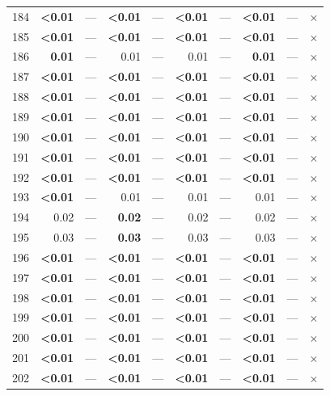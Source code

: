 \begin{longtable}{lr@{\hskip 4pt}l@{\hskip 12pt}r@{\hskip 4pt}l@{\hskip 12pt}r@{\hskip 4pt}l@{\hskip 12pt}r@{\hskip 4pt}l@{\hskip 12pt}r}
184 & \textbf{<0.01} & --- & \textbf{<0.01} & --- & \textbf{<0.01} & --- & \textbf{<0.01} & --- & $\times$ \\
185 & \textbf{<0.01} & --- & \textbf{<0.01} & --- & \textbf{<0.01} & --- & \textbf{<0.01} & --- & $\times$ \\
186 & \textbf{0.01} & --- & 0.01 & --- & 0.01 & --- & \textbf{0.01} & --- & $\times$ \\
187 & \textbf{<0.01} & --- & \textbf{<0.01} & --- & \textbf{<0.01} & --- & \textbf{<0.01} & --- & $\times$ \\
188 & \textbf{<0.01} & --- & \textbf{<0.01} & --- & \textbf{<0.01} & --- & \textbf{<0.01} & --- & $\times$ \\
189 & \textbf{<0.01} & --- & \textbf{<0.01} & --- & \textbf{<0.01} & --- & \textbf{<0.01} & --- & $\times$ \\
190 & \textbf{<0.01} & --- & \textbf{<0.01} & --- & \textbf{<0.01} & --- & \textbf{<0.01} & --- & $\times$ \\
191 & \textbf{<0.01} & --- & \textbf{<0.01} & --- & \textbf{<0.01} & --- & \textbf{<0.01} & --- & $\times$ \\
192 & \textbf{<0.01} & --- & \textbf{<0.01} & --- & \textbf{<0.01} & --- & \textbf{<0.01} & --- & $\times$ \\
193 & \textbf{<0.01} & --- & 0.01 & --- & 0.01 & --- & 0.01 & --- & $\times$ \\
194 & 0.02 & --- & \textbf{0.02} & --- & 0.02 & --- & 0.02 & --- & $\times$ \\
195 & 0.03 & --- & \textbf{0.03} & --- & 0.03 & --- & 0.03 & --- & $\times$ \\
196 & \textbf{<0.01} & --- & \textbf{<0.01} & --- & \textbf{<0.01} & --- & \textbf{<0.01} & --- & $\times$ \\
197 & \textbf{<0.01} & --- & \textbf{<0.01} & --- & \textbf{<0.01} & --- & \textbf{<0.01} & --- & $\times$ \\
198 & \textbf{<0.01} & --- & \textbf{<0.01} & --- & \textbf{<0.01} & --- & \textbf{<0.01} & --- & $\times$ \\
199 & \textbf{<0.01} & --- & \textbf{<0.01} & --- & \textbf{<0.01} & --- & \textbf{<0.01} & --- & $\times$ \\
200 & \textbf{<0.01} & --- & \textbf{<0.01} & --- & \textbf{<0.01} & --- & \textbf{<0.01} & --- & $\times$ \\
201 & \textbf{<0.01} & --- & \textbf{<0.01} & --- & \textbf{<0.01} & --- & \textbf{<0.01} & --- & $\times$ \\
202 & \textbf{<0.01} & --- & \textbf{<0.01} & --- & \textbf{<0.01} & --- & \textbf{<0.01} & --- & $\times$ \\

\end{longtable}

